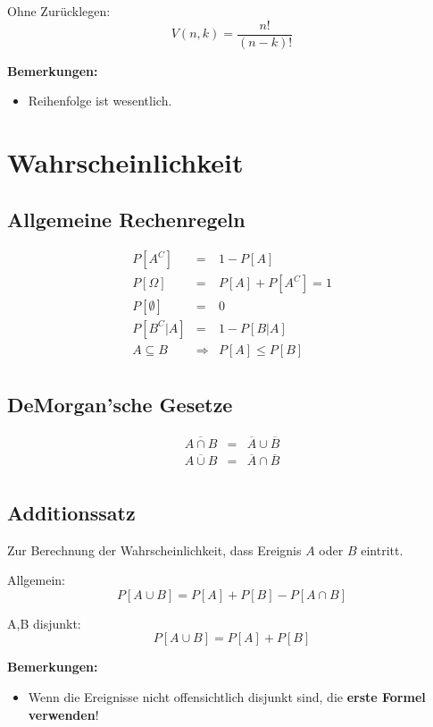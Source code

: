 \documentclass[10pt,a4paper,twocolumn]{article}
\begin{document}
Ohne Zurücklegen:
\[
V(n,k)=\frac{n!}{(n-k)!}
\]

\textbf{Bemerkungen:}
\begin{itemize}
\item Reihenfolge ist wesentlich.
\end{itemize}

\section{Wahrscheinlichkeit}

\subsection{Allgemeine Rechenregeln}
\[
\begin{array}{rcl}
	P\left[A^C\right] & = & 1-P[A] \\
	P\left[\Omega\right] & = & P[A]+P\left[A^C\right]=1 \\
	P[\emptyset] & = & 0 \\
	P\left[B^C|A\right] & = & 1-P[B|A] \\
	A\subseteq B & \Rightarrow & P[A] \leq P[B] \\
\end{array}
\]

\subsection{DeMorgan'sche Gesetze}
\[
\begin{array}{rcl}
	\overline{A\cap B} & = & \overline{A}\cup\overline{B} \\
	\overline{A\cup B} & = & \overline{A}\cap\overline{B}\\
\end{array}
\]

\subsection{Additionssatz}
Zur Berechnung der Wahrscheinlichkeit, dass Ereignis $A$ oder $B$ eintritt.

\vspace{10pt}

Allgemein:
\[
P[A \cup B] = P[A] + P[B] - P[A \cap B]
\]

A,B disjunkt:
\[
P[A \cup B] = P[A] + P[B]
\]

\textbf{Bemerkungen:}
\begin{itemize}
\item Wenn die Ereignisse nicht offensichtlich disjunkt sind, die \textbf{erste Formel verwenden}!
\end{itemize}
\end{document}
